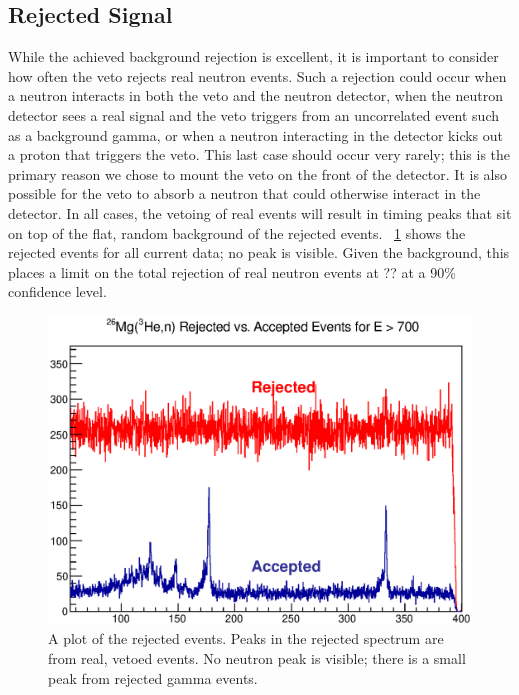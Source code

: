 \subsection{Rejected Signal}

While the achieved background rejection is excellent, it is important to consider how often the veto rejects real neutron events.  Such a rejection could occur when a neutron interacts in both the veto and the neutron detector, when the neutron detector sees a real signal and the veto triggers from an uncorrelated event such as a background gamma, or when a neutron interacting in the detector kicks out a proton that triggers the veto.  This last case should occur very rarely; this is the primary reason we chose to mount the veto on the front of the detector.  It is also possible for the veto to absorb a neutron that could otherwise interact in the detector.  In all cases, the vetoing of real events will result in timing peaks that sit on top of the flat, random background of the rejected events.  {\fig}~\ref{fig:rejectionTOF} shows the rejected events for all current  data; no peak is visible.  Given the background, this places a limit on the total rejection of real neutron events at ?? at a 90\% confidence level.  
\begin{figure}[htp]
\centering
\includegraphics[width=5in]{figures/26Mg_rejection.eps}
\caption{\label{fig:rejection}A plot of the rejected events.  Peaks in the rejected spectrum are from real, vetoed events.  No neutron peak is visible; there is a small peak from rejected gamma events.}
\label{fig:rejectionTOF}
\end{figure}

